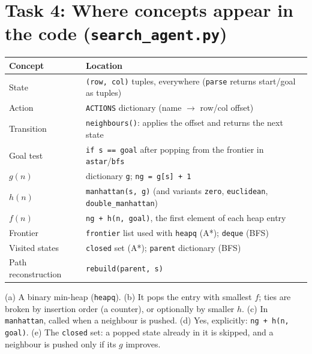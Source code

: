 \documentclass[10pt,a4paper]{article}
\begin{document}
\section*{Task 4: Where concepts appear in the code (\texttt{search\_agent.py})}
\begin{tabular}{p{3cm}p{13cm}}\toprule
Concept & Location\\\midrule
State & \texttt{(row, col)} tuples, everywhere (\texttt{parse} returns start/goal as tuples)\\
Action & \texttt{ACTIONS} dictionary (name $\to$ row/col offset)\\
Transition & \texttt{neighbours()}: applies the offset and returns the next state\\
Goal test & \texttt{if s == goal} after popping from the frontier in \texttt{astar}/\texttt{bfs}\\
$g(n)$ & dictionary \texttt{g}; \texttt{ng = g[s] + 1}\\
$h(n)$ & \texttt{manhattan(s, g)} (and variants \texttt{zero}, \texttt{euclidean}, \texttt{double\_manhattan})\\
$f(n)$ & \texttt{ng + h(n, goal)}, the first element of each heap entry\\
Frontier & \texttt{frontier} list used with \texttt{heapq} (A*); \texttt{deque} (BFS)\\
Visited states & \texttt{closed} set (A*); \texttt{parent} dictionary (BFS)\\
Path reconstruction & \texttt{rebuild(parent, s)}\\\bottomrule\end{tabular}

(a) A binary min-heap (\texttt{heapq}). (b) It pops the entry with smallest $f$; ties are broken by insertion order (a counter), or optionally by smaller $h$. (c) In \texttt{manhattan}, called when a neighbour is pushed. (d) Yes, explicitly: \texttt{ng + h(n, goal)}. (e) The \texttt{closed} set: a popped state already in it is skipped, and a neighbour is pushed only if its $g$ improves.
\end{document}
